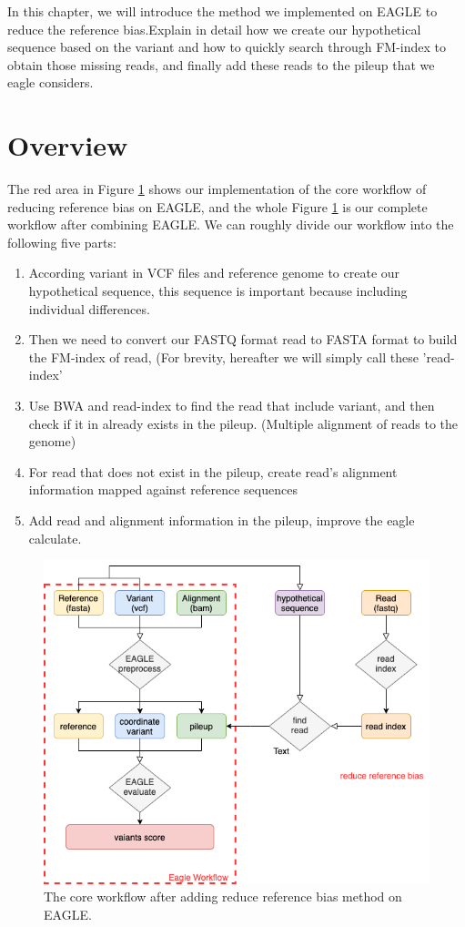 \hspace{24pt}
In this chapter, we will introduce the method we implemented on EAGLE to reduce the reference bias.Explain in detail how we create our hypothetical sequence based on the variant and how to quickly search through FM-index to obtain those missing reads, and finally add these reads to the pileup that we eagle considers.
\section{Overview}
The red area in Figure \ref{f3-1} shows our implementation of the core workflow of reducing reference bias on EAGLE, and the whole  Figure \ref{f3-1} is our complete workflow after combining EAGLE. 
We can roughly divide our workflow into the following five parts:
\begin{enumerate}
    \item According variant in VCF files and reference genome to create our hypothetical sequence, this sequence is important because including individual differences.
    \item Then we need to convert our FASTQ format read to FASTA format to build the FM-index of read, (For brevity, hereafter we will simply call these 'read-index'
    \item Use BWA and read-index to find the read that include variant, and then check if it in already exists in the pileup. (Multiple alignment of reads to the genome)
    \item For read that does not exist in the pileup, create read's alignment information mapped against reference sequences 
    \item Add read and alignment information in the pileup, improve the eagle calculate.

\end{enumerate}

\begin{figure}[H]
    \centering
    \includegraphics[width=0.8\columnwidth]{body/image/3-1.png}
    \captionsetup{labelfont=bf}
    \renewcommand{\baselinestretch}{1.0}
    \caption[Core workflow]{The core workflow after adding reduce reference bias method on EAGLE.}
    \label{f3-1}
\end{figure}

